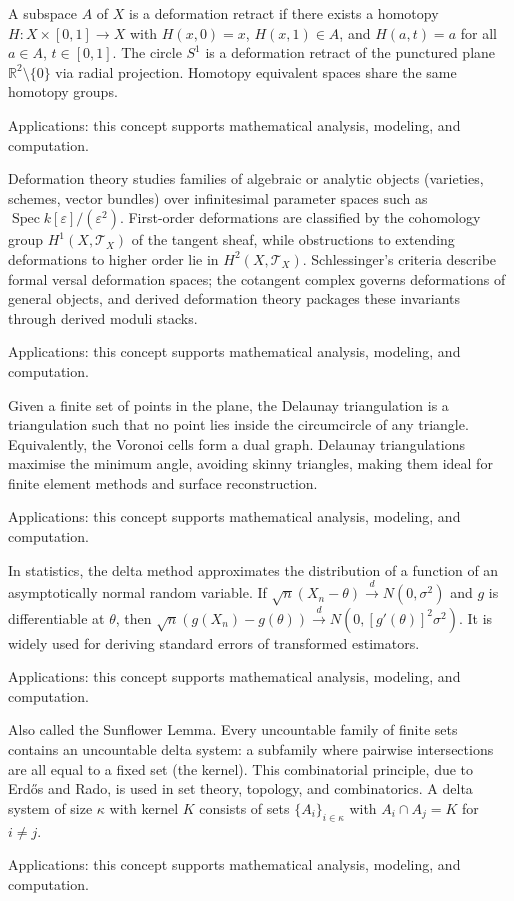 A subspace $A$ of $X$ is a deformation retract if there exists a homotopy $H: X \times [0,1] \to X$ with $H(x,0) = x$, $H(x,1) \in A$, and $H(a,t) = a$ for all $a \in A$, $t \in [0,1]$. The circle $S^1$ is a deformation retract of the punctured plane $\mathbb{R}^2 \setminus \{0\}$ via radial projection. Homotopy equivalent spaces share the same homotopy groups. \par\noindent Applications: this concept supports mathematical analysis, modeling, and computation.

Deformation theory studies families of algebraic or analytic objects (varieties, schemes, vector bundles) over infinitesimal parameter spaces such as $\operatorname{Spec} k[\varepsilon]/(\varepsilon^2)$. First-order deformations are classified by the cohomology group $H^1(X, \mathcal{T}_X)$ of the tangent sheaf, while obstructions to extending deformations to higher order lie in $H^2(X, \mathcal{T}_X)$. Schlessinger's criteria describe formal versal deformation spaces; the cotangent complex governs deformations of general objects, and derived deformation theory packages these invariants through derived moduli stacks. \par\noindent Applications: this concept supports mathematical analysis, modeling, and computation.

Given a finite set of points in the plane, the Delaunay triangulation is a triangulation such that no point lies inside the circumcircle of any triangle. Equivalently, the Voronoi cells form a dual graph. Delaunay triangulations maximise the minimum angle, avoiding skinny triangles, making them ideal for finite element methods and surface reconstruction. \par\noindent Applications: this concept supports mathematical analysis, modeling, and computation.

In statistics, the delta method approximates the distribution of a function of an asymptotically normal random variable. If $\sqrt{n}(X_n - \theta) \xrightarrow{d} N(0, \sigma^2)$ and $g$ is differentiable at $\theta$, then $\sqrt{n}(g(X_n) - g(\theta)) \xrightarrow{d} N(0, [g'(\theta)]^2\sigma^2)$. It is widely used for deriving standard errors of transformed estimators. \par\noindent Applications: this concept supports mathematical analysis, modeling, and computation.

Also called the Sunflower Lemma. Every uncountable family of finite sets contains an uncountable delta system: a subfamily where pairwise intersections are all equal to a fixed set (the kernel). This combinatorial principle, due to Erdős and Rado, is used in set theory, topology, and combinatorics. A delta system of size $\kappa$ with kernel $K$ consists of sets $\{A_i\}_{i \in \kappa}$ with $A_i \cap A_j = K$ for $i \neq j$. \par\noindent Applications: this concept supports mathematical analysis, modeling, and computation.

